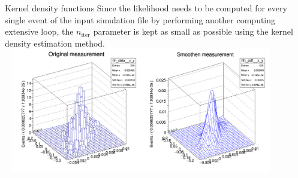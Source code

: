\documentclass[handout,8 pt]{beamer}
\begin{document}
\begin{frame}{Kernel density functions}
\justifying
Since the likelihood needs to be computed for every single event of the input simulation file by performing another computing extensive loop, the $n_{\text{iter}}$ parameter is kept as small as possible using the kernel density estimation method. \vfill
\includegraphics[width=12cm, height=5.5cm]{figs/plot_kernelx.png} \vfill
\end{frame}
\end{document}
